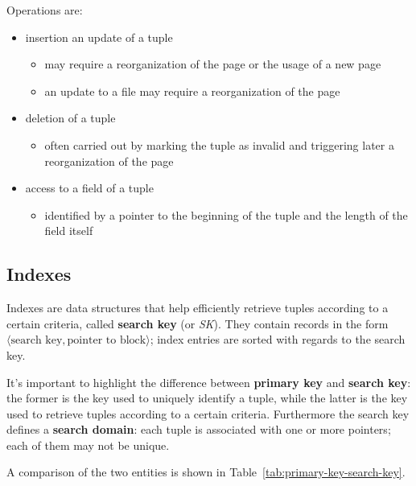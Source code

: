 \documentclass[english]{article}
\begin{document}
Operations are:

\begin{itemize}
  \item insertion an update of a tuple
        \begin{itemize}
          \item may require a reorganization of the page or the usage of a new page
          \item an update to a file may require a reorganization of the page
        \end{itemize}
  \item deletion of a tuple
        \begin{itemize}
          \item often carried out by marking the tuple as invalid and triggering later a reorganization of the page
        \end{itemize}
  \item access to a field of a tuple
        \begin{itemize}
          \item identified by a pointer to the beginning of the tuple and the length of the field itself
        \end{itemize}
\end{itemize}

\subsection{Indexes}

Indexes are data structures that help efficiently retrieve tuples according to a certain criteria, called \textbf{search key} (or \textit{SK}).
They contain records in the form \(\langle \text{search key}, \text{pointer to block} \rangle\); index entries are sorted with regards to the search key.

It's important to highlight the difference between \textbf{primary key} and \textbf{search key}:
the former is the key used to uniquely identify a tuple, while the latter is the key used to retrieve tuples according to a certain criteria.
Furthermore the search key defines a \textbf{search domain}: each tuple is associated with one or more pointers; each of them may not be unique.

A comparison of the two entities is shown in Table~\ref{tab:primary-key-search-key}.
\end{document}
